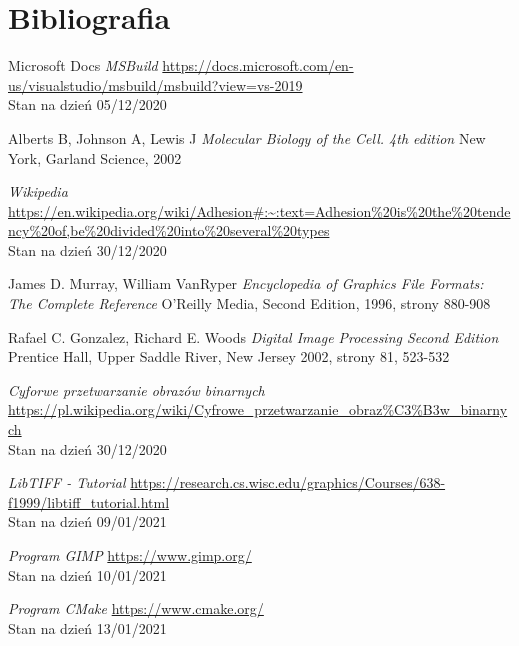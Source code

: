 \documentclass{article}
\begin{document}
    \section{Bibliografia}
    \begin{thebibliography}{9}

        Microsoft Docs
        \textit{MSBuild}
        \url{https://docs.microsoft.com/en-us/visualstudio/msbuild/msbuild?view=vs-2019}\\
        Stan na dzień 05/12/2020

        Alberts B, Johnson A, Lewis J
        \textit{Molecular Biology of the Cell. 4th edition}
        New York, Garland Science, 2002

        \textit{Wikipedia}
        \url{https://en.wikipedia.org/wiki/Adhesion#:~:text=Adhesion%20is%20the%20tendency%20of,be%20divided%20into%20several%20types}\\
        Stan na dzień 30/12/2020

        James D. Murray, William VanRyper
        \textit{Encyclopedia of Graphics File Formats: The Complete Reference}
        O'Reilly Media, Second Edition, 1996, strony 880-908

        Rafael C. Gonzalez, Richard E. Woods
        \textit{Digital Image Processing Second Edition}
        Prentice Hall, Upper Saddle River, New Jersey 2002, strony 81, 523-532

        \textit{Cyforwe przetwarzanie obrazów binarnych}
        \url{https://pl.wikipedia.org/wiki/Cyfrowe_przetwarzanie_obraz%C3%B3w_binarnych}\\
        Stan na dzień 30/12/2020

        \textit{LibTIFF - Tutorial}
        \url{https://research.cs.wisc.edu/graphics/Courses/638-f1999/libtiff_tutorial.html}\\
        Stan na dzień 09/01/2021
    
        \textit{Program GIMP}
        \url{https://www.gimp.org/}\\
        Stan na dzień 10/01/2021

        \textit{Program CMake}
        \url{https://www.cmake.org/}\\
        Stan na dzień 13/01/2021


\end{thebibliography}
\end{document}
